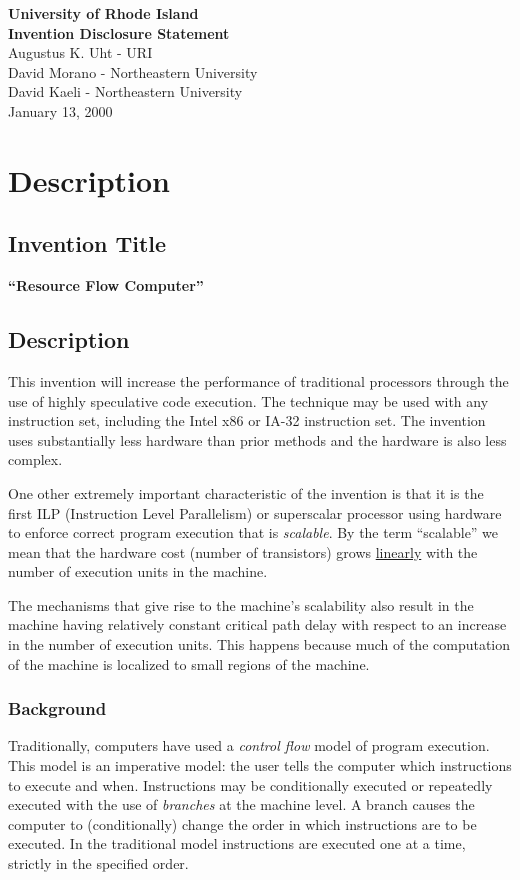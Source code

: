 \documentclass[10pt,dvips]{article}
\begin{document}
\begin{center}
{\Large \bf University of Rhode Island}\\
{\Large \bf Invention Disclosure Statement}\\
\vspace{0.1in}
Augustus K. Uht - URI\\
David Morano - Northeastern University\\
David Kaeli - Northeastern University\\
January 13, 2000
\end{center}

\section{Description}
\subsection{Invention Title}
{\bf ``Resource Flow Computer''}


\subsection{Description}
\label{desc}
This invention will increase the performance of traditional processors through the
use of highly speculative code execution. The technique may be used with any
instruction set, including the Intel x86 or IA-32 instruction set. The invention
uses substantially less hardware than prior methods and the hardware is also less
complex.

One other extremely important characteristic of the invention is that it is
the first ILP (Instruction Level Parallelism) or superscalar processor using
hardware to enforce correct program execution that is {\it scalable}. By the term
``scalable'' we mean that the hardware cost (number of transistors) grows
\underline{linearly} with the number of execution units in the machine.

The mechanisms that give rise to the machine's scalability also result in the machine
having relatively constant critical path delay with respect to an increase in the
number of execution units. This happens because much of the computation of the
machine is localized to small regions of the machine.


\subsubsection{Background}
\label{background}
Traditionally, computers have used a {\it control flow} model of program execution.
This model is an imperative model: the user tells the computer which instructions to
execute and when. Instructions may be conditionally executed or repeatedly
executed with the use of {\it branches} at the machine level. A branch causes
the computer to (conditionally) change the order in which instructions are
to be executed. In the traditional model instructions are executed one at a time,
strictly in the specified order.
\end{document}
